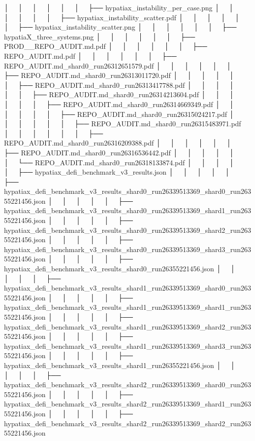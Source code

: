 │   │       │   │       │   │   ├── hypatiax_instability_per_case.png
│   │       │   │       │   │   ├── hypatiax_instability_scatter.pdf
│   │       │   │       │   │   ├── hypatiax_instability_scatter.png
│   │       │   │       │   │   ├── hypatiaX_three_systems.png
│   │       │   │       │   │   ├── PROD__REPO_AUDIT.md.pdf
│   │       │   │       │   │   ├── REPO_AUDIT.md.pdf
│   │       │   │       │   │   ├── REPO_AUDIT.md_shard0_run26312651579.pdf
│   │       │   │       │   │   ├── REPO_AUDIT.md_shard0_run26313011720.pdf
│   │       │   │       │   │   ├── REPO_AUDIT.md_shard0_run26313417788.pdf
│   │       │   │       │   │   ├── REPO_AUDIT.md_shard0_run26314213604.pdf
│   │       │   │       │   │   ├── REPO_AUDIT.md_shard0_run26314669349.pdf
│   │       │   │       │   │   ├── REPO_AUDIT.md_shard0_run26315024217.pdf
│   │       │   │       │   │   ├── REPO_AUDIT.md_shard0_run26315483971.pdf
│   │       │   │       │   │   ├── REPO_AUDIT.md_shard0_run26316209388.pdf
│   │       │   │       │   │   ├── REPO_AUDIT.md_shard0_run26316536442.pdf
│   │       │   │       │   │   └── REPO_AUDIT.md_shard0_run26318133874.pdf
│   │       │   │       │   ├── hypatiax_defi_benchmark_v3_results.json
│   │       │   │       │   ├── hypatiax_defi_benchmark_v3_results_shard0_run26339513369_shard0_run26355221456.json
│   │       │   │       │   ├── hypatiax_defi_benchmark_v3_results_shard0_run26339513369_shard1_run26355221456.json
│   │       │   │       │   ├── hypatiax_defi_benchmark_v3_results_shard0_run26339513369_shard2_run26355221456.json
│   │       │   │       │   ├── hypatiax_defi_benchmark_v3_results_shard0_run26339513369_shard3_run26355221456.json
│   │       │   │       │   ├── hypatiax_defi_benchmark_v3_results_shard0_run26355221456.json
│   │       │   │       │   ├── hypatiax_defi_benchmark_v3_results_shard1_run26339513369_shard0_run26355221456.json
│   │       │   │       │   ├── hypatiax_defi_benchmark_v3_results_shard1_run26339513369_shard1_run26355221456.json
│   │       │   │       │   ├── hypatiax_defi_benchmark_v3_results_shard1_run26339513369_shard2_run26355221456.json
│   │       │   │       │   ├── hypatiax_defi_benchmark_v3_results_shard1_run26339513369_shard3_run26355221456.json
│   │       │   │       │   ├── hypatiax_defi_benchmark_v3_results_shard1_run26355221456.json
│   │       │   │       │   ├── hypatiax_defi_benchmark_v3_results_shard2_run26339513369_shard0_run26355221456.json
│   │       │   │       │   ├── hypatiax_defi_benchmark_v3_results_shard2_run26339513369_shard1_run26355221456.json
│   │       │   │       │   ├── hypatiax_defi_benchmark_v3_results_shard2_run26339513369_shard2_run26355221456.json
